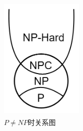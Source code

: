 		\begin{figure}[!htbp]
		\begin{minipage}[t]{1\linewidth}
			\centering
			\includegraphics[width=4cm,height=6cm]{image/P_NP5.png}
			\caption{$P\neq NP$时关系图} \label{fig:P-neq-NP}
		\end{minipage}
	\end{figure}
	
